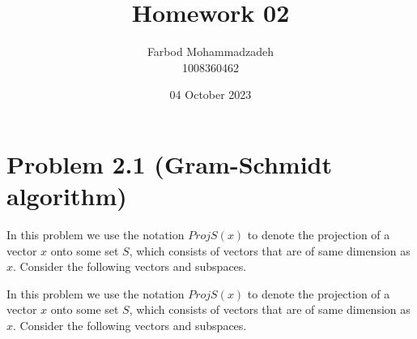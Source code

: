 \documentclass[20pt]{article}
\title{Homework 02}
\author{Farbod Mohammadzadeh\\1008360462}
\date{04 October 2023}
\begin{document}
\Large
\maketitle

\newpage

\section*{Problem 2.1 (Gram-Schmidt algorithm)}

In this problem we use the notation $ProjS (x)$ to denote the projection of a vector $x$ onto some set
$S$, which consists of vectors that are of same dimension as $x$. Consider the following vectors and
subspaces.

In this problem we use the notation $ProjS (x)$ to denote the projection of a vector $x$ onto some set
$S$, which consists of vectors that are of same dimension as $x$. Consider the following vectors and
subspaces.
\end{document}
